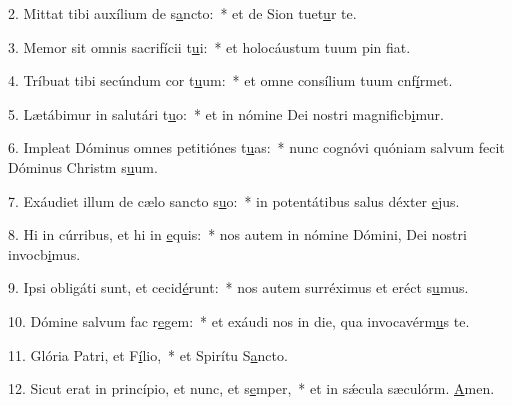 2. Mittat tibi auxílium de s\uline{a}ncto:~* et de Sion tuet\uline{u}r te.\par 
3. Memor sit omnis sacrifícii t\uline{u}i:~* et holocáustum tuum pin f\uline{i}at.\par 
4. Tríbuat tibi secúndum cor t\uline{u}um:~* et omne consílium tuum cnf\uline{í}rmet.\par 
5. Lætábimur in salutári t\uline{u}o:~* et in nómine Dei nostri magnificb\uline{i}mur.\par 
6. Impleat Dóminus omnes petitiónes t\uline{u}as:~* nunc cognóvi quóniam salvum fecit Dóminus Christm s\uline{u}um.\par 
7. Exáudiet illum de cælo sancto s\uline{u}o:~* in potentátibus salus déxter \uline{e}jus.\par 
8. Hi in cúrribus, et hi in \uline{e}quis:~* nos autem in nómine Dómini, Dei nostri invocb\uline{i}mus.\par 
9. Ipsi obligáti sunt, et cecid\uline{é}runt:~* nos autem surréximus et eréct s\uline{u}mus.\par 
10. Dómine salvum fac r\uline{e}gem:~* et exáudi nos in die, qua invocavérm\uline{u}s te.\par 
11. Glória Patri, et F\uline{í}lio,~* et Spirítu S\uline{a}ncto.\par 
12. Sicut erat in princípio, et nunc, et s\uline{e}mper,~* et in sǽcula sæculórm. \uline{A}men.\par 
